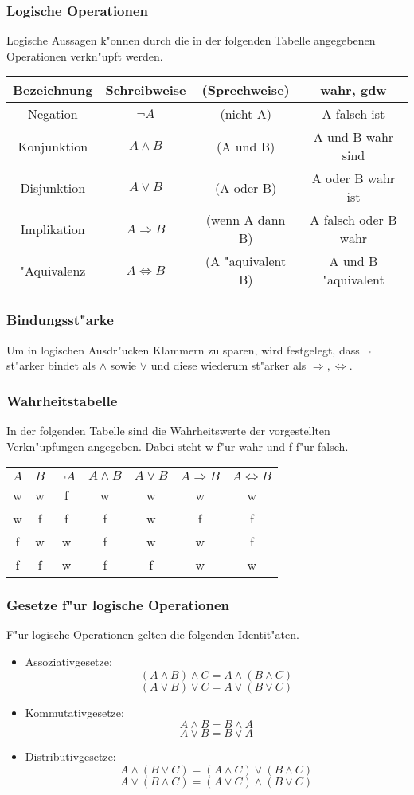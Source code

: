 \documentclass{beamer}
\begin{document}
\begin{frame}
  \frametitle{Logische Operationen}
  Logische Aussagen k"onnen durch die in der folgenden Tabelle angegebenen Operationen verkn"upft werden.
  
  \begin{tabular}[h]{c|cc|c}
   
    Bezeichnung & Schreibweise & (Sprechweise) & wahr, gdw \\
    \hline
    Negation & $\neg A$ & (nicht A) & A falsch ist \\
    Konjunktion & $A\wedge B$ & (A und B) & A und B wahr sind \\
    Disjunktion & $A\vee B$ & (A oder B) & A oder B wahr ist \\
    Implikation & $A\Rightarrow B$ & (wenn A dann B) & A falsch oder B wahr \\
    "Aquivalenz & $A\Leftrightarrow B$ & (A "aquivalent B) & A und B "aquivalent 


    \end{tabular}
\end{frame}

\begin{frame}
  \frametitle{Bindungsst"arke}
  Um in logischen Ausdr"ucken Klammern zu sparen, wird festgelegt, dass $\neg$ st"arker bindet als $\wedge$ sowie $\vee$ und diese wiederum st"arker als $\Rightarrow, \Leftrightarrow$.
\end{frame}

\begin{frame}
  \frametitle{Wahrheitstabelle}
  In der folgenden Tabelle sind die Wahrheitswerte der vorgestellten Verkn"upfungen angegeben. Dabei steht w f"ur wahr und f f"ur falsch.
  \begin{tabular}[h]{c|c|c|c|c|c|c}
   
    $A$ & $B$ & $\neg A$ & $A\wedge B$ & $A\vee B$ & $A\Rightarrow B$ & $A\Leftrightarrow B$ \\
    \hline
    w & w & f & w & w & w & w \\
    w & f & f & f & w & f & f \\
    f & w & w & f & w & w & f \\
    f & f & w & f & f & w & w
    
  \end{tabular}
\end{frame}

\begin{frame}
  \frametitle{Gesetze f"ur logische Operationen}
  F"ur logische Operationen gelten die folgenden Identit"aten. 
  \begin{itemize}
    \item Assoziativgesetze: \[(A\wedge B)\wedge C = A\wedge(B\wedge C)\] \[(A\vee B)\vee C = A\vee(B\vee C)\]
    \item Kommutativgesetze: \[A\wedge B = B\wedge A\]\[A\vee B = B\vee A\]
    \item Distributivgesetze: \[A \wedge (B\vee C) = (A\wedge C)\vee (B\wedge C)\] \[A\vee (B\wedge C) = (A\vee C)\wedge (B\vee C)\]
  \end{itemize}
   
\end{frame}
\end{document}
